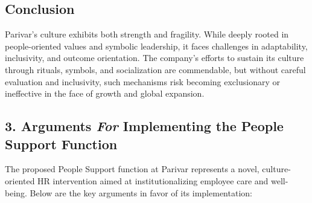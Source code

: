 \documentclass[10pt,a4paper]{book}
\begin{document}
\subsection*{Conclusion}

Parivar's culture exhibits both strength and fragility. While deeply rooted in people-oriented values and symbolic leadership, it faces challenges in adaptability, inclusivity, and outcome orientation. The company’s efforts to sustain its culture through rituals, symbols, and socialization are commendable, but without careful evaluation and inclusivity, such mechanisms risk becoming exclusionary or ineffective in the face of growth and global expansion.

\subsection*{3. Arguments \textit{For} Implementing the People Support Function}

The proposed People Support function at Parivar represents a novel, culture-oriented HR intervention aimed at institutionalizing employee care and well-being. Below are the key arguments in favor of its implementation:
\end{document}
